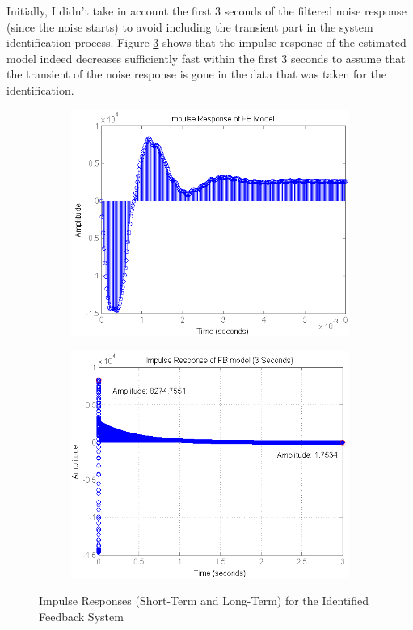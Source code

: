 Initially, I didn't take in account the first 3 seconds of the filtered noise response (since the noise starts) to avoid including the transient part in the system identification process. Figure \ref{fig:impulse_FB_3sec} shows that the impulse response of the estimated model indeed decreases sufficiently fast within the first 3 seconds to assume that the transient of the noise response is gone in the data that was taken for the identification.\\

\begin{figure}[h]
\centering
\begin{subfigure}[b]{0.5\textwidth}
\includegraphics[width=1.0\textwidth]{pics/impulse_FB}
\caption{}
\label{fig:impulse_FB}
\end{subfigure}\;\begin{subfigure}[b]{0.5\textwidth}
\includegraphics[width=1.0\textwidth]{pics/impulse_FB_3sec}
\caption{}
\label{fig:impulse_FB_3sec}
\end{subfigure}
\caption{Impulse Responses (Short-Term and Long-Term) for the Identified Feedback System}
\end{figure}


